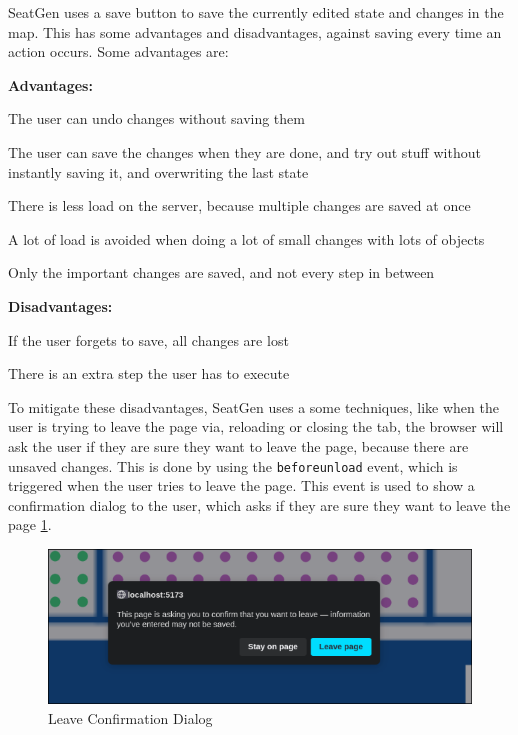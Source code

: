 SeatGen uses a save button to save the currently edited state and changes in the map. This has some advantages and disadvantages, against saving every time an action occurs. Some advantages are:

\textbf{Advantages:}
\begin{compactitem}
    \item The user can undo changes without saving them
    \item The user can save the changes when they are done, and try out stuff without instantly saving it, and overwriting the last state
    \item There is less load on the server, because multiple changes are saved at once
    \item A lot of load is avoided when doing a lot of small changes with lots of objects
    \item Only the important changes are saved, and not every step in between
\end{compactitem}

\textbf{Disadvantages:}
\begin{compactitem}
\item If the user forgets to save, all changes are lost
\item There is an extra step the user has to execute
\end{compactitem}

To mitigate these disadvantages, SeatGen uses a some techniques, like when the user is trying to leave the page via, reloading or closing the tab, the browser will ask the user if they are sure they want to leave the page, because there are unsaved changes. This is done by using the \texttt{beforeunload} event, which is triggered when the user tries to leave the page. This event is used to show a confirmation dialog to the user, which asks if they are sure they want to leave the page \ref{fig:save-button}.

\begin{figure}
    \centering
    \includegraphics[scale=0.5]{pics/save-button.png}
    \caption{Leave Confirmation Dialog}
    \label{fig:save-button}
\end{figure}

